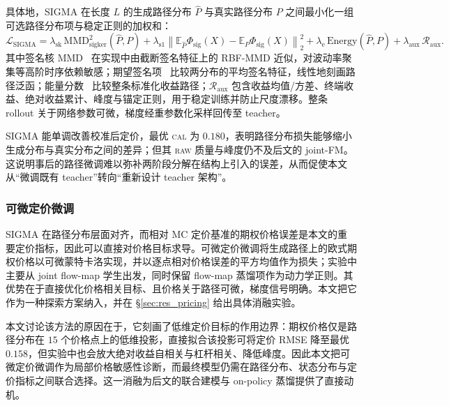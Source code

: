 \documentclass[11pt]{ctexart}
\newcommand{\raw}{\textsc{raw}}
\renewcommand{\cal}{\textsc{cal}}
\newcommand{\E}{\mathbb{E}}
\begin{document}
具体地，SIGMA 在长度 $L$ 的生成路径分布 $\hat P$ 与真实路径分布 $P$ 之间最小化一组可选路径分布项与稳定正则的加权和：
\begin{equation}
\mathcal L_{\mathrm{SIGMA}}
= \lambda_{\mathrm{sk}}\,\mathrm{MMD}^2_{\mathrm{sigker}}(\hat P,P)
+ \lambda_{\mathrm{s1}}\left\|\E_{\hat P}\Phi_{\mathrm{sig}}(X)-\E_{P}\Phi_{\mathrm{sig}}(X)\right\|_2^2
+ \lambda_{\mathrm{e}}\,\mathrm{Energy}(\hat P,P)
+ \lambda_{\mathrm{aux}}\,\mathcal R_{\mathrm{aux}} .
\end{equation}
其中签名核 MMD~\citep{salvi2021signature,issa2023nonadversarial,gretton2012kernel} 在实现中由截断签名特征上的 RBF-MMD 近似，对波动率聚集等高阶时序依赖敏感；期望签名项~\citep{ni2021sigwgan,ni2020conditional} 比较两分布的平均签名特征，线性地刻画路径泛函；能量分数~\citep{pacchiardi2024probabilistic} 比较整条标准化收益路径；$\mathcal R_{\mathrm{aux}}$ 包含收益均值/方差、终端收益、绝对收益累计、峰度与锚定正则，用于稳定训练并防止尺度漂移。整条 rollout 关于网络参数可微，梯度经重参数化采样回传至 teacher。

SIGMA 能单调改善校准后定价，最优 \cal{} 为 $0.180$，表明路径分布损失能够缩小生成分布与真实分布之间的差异；但其 \raw{} 质量与峰度仍不及后文的 joint-FM。这说明事后的路径微调难以弥补两阶段分解在结构上引入的误差，从而促使本文从“微调既有 teacher”转向“重新设计 teacher 架构”。

\subsubsection{可微定价微调}
\label{sec:diffprice}
SIGMA 在路径分布层面对齐，而相对 MC 定价基准的期权价格误差是本文的重要定价指标，因此可以直接对价格目标求导。可微定价微调将生成路径上的欧式期权价格以可微蒙特卡洛实现，并以逐点相对价格误差的平方均值作为损失；实验中主要从 joint flow-map 学生出发，同时保留 flow-map 蒸馏项作为动力学正则。其优势在于直接优化价格相关目标、且价格关于路径可微，梯度信号明确。本文把它作为一种探索方案纳入，并在 \S\ref{sec:res_pricing} 给出具体消融实验。

本文讨论该方法的原因在于，它刻画了低维定价目标的作用边界：期权价格仅是路径分布在 $15$ 个价格点上的低维投影，直接拟合该投影可将定价 RMSE 降至最优 $0.158$，但实验中也会放大绝对收益自相关与杠杆相关、降低峰度。因此本文把可微定价微调作为局部价格敏感性诊断，而最终模型仍需在路径分布、状态分布与定价指标之间联合选择。这一消融为后文的联合建模与 on-policy 蒸馏提供了直接动机。
\end{document}
